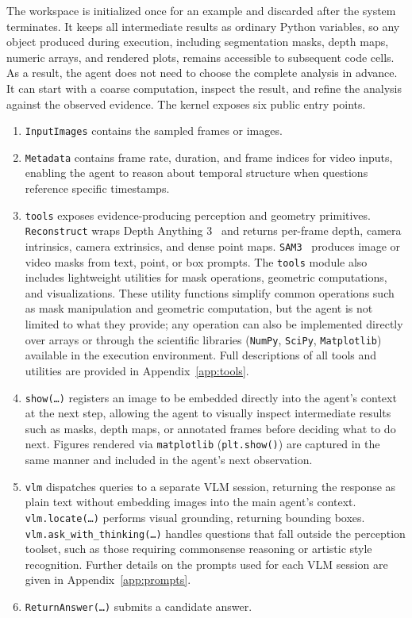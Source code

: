 \documentclass{llmxive}
\begin{document}
The workspace is initialized once for an example and discarded after the system terminates.
It keeps all intermediate results as ordinary Python variables, so any object produced during execution, including segmentation masks, depth maps, numeric arrays, and rendered plots, remains accessible to subsequent code cells.
As a result, the agent does not need to choose the complete analysis in advance.
It can start with a coarse computation, inspect the result, and refine the analysis against the observed evidence. The kernel exposes six public entry points.
\begin{enumerate}[leftmargin=2em, itemsep=1pt, topsep=1pt]
    \item \texttt{InputImages} contains the sampled frames or images.
    \item \texttt{Metadata} contains frame rate, duration, and frame indices for video inputs, enabling the agent to reason about temporal structure when questions reference specific timestamps.
    \item \texttt{tools} exposes evidence-producing perception and geometry primitives.
    \texttt{Reconstruct} wraps Depth Anything 3~\citep{depthanything3} and returns per-frame depth, camera intrinsics, camera extrinsics, and dense point maps.
    \texttt{SAM3}~\citep{carion2025sam} produces image or video masks from text, point, or box prompts.
    The \texttt{tools} module also includes lightweight utilities for mask operations, geometric computations, and visualizations.
    These utility functions simplify common operations such as mask manipulation and geometric computation, but the agent is not limited to what they provide; any operation can also be implemented directly over arrays or through the scientific libraries (\texttt{NumPy}, \texttt{SciPy}, \texttt{Matplotlib}) available in the execution environment. Full descriptions of all tools and utilities are provided in Appendix~\ref{app:tools}.
    \item \texttt{show(\ldots)} registers an image to be embedded directly into the agent's context at the next step, allowing the agent to visually inspect intermediate results such as masks, depth maps, or annotated frames before deciding what to do next. Figures rendered via \texttt{matplotlib} (\texttt{plt.show()}) are captured in the same manner and included in the agent's next observation.
    \item \texttt{vlm} dispatches queries to a separate VLM session, returning the response as plain text without embedding images into the main agent's context.
    \texttt{vlm.locate(\ldots)} performs visual grounding, returning bounding boxes.
    \texttt{vlm.ask\_with\_thinking(\ldots)} handles questions that fall outside the perception toolset, such as those requiring commonsense reasoning or artistic style recognition. 
    Further details on the prompts used for each VLM session are given in Appendix~\ref{app:prompts}.
    \item \texttt{ReturnAnswer(\ldots)} submits a candidate answer.
\end{enumerate}
\end{document}
